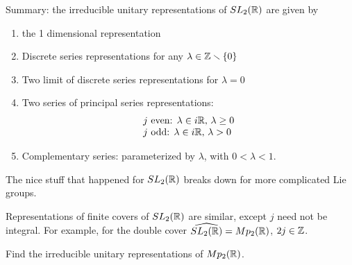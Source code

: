  Summary: the irreducible unitary representations of $SL_2(\mathbb{R})$ are given by
 \begin{enumerate}
   \item the 1 dimensional representation
   \item Discrete series representations for any $\lambda\in \mathbb{Z}\smallsetminus \{0\}$
   \item Two limit of discrete series representations for $\lambda=0$
   \item Two series of principal series representations:
   \[\begin{tabular}{l}
     $j$ even: $\lambda\in i\RR$, $\lambda \ge 0$\\
     $j$ odd: $\lambda \in i\RR$, $\lambda > 0$
   \end{tabular}\]
   \item Complementary series: parameterized by $\lambda$, with $0< \lambda < 1$.
 \end{enumerate}

 The nice stuff that happened for $SL_2(\mathbb{R})$ breaks down for more complicated Lie
 groups.

 Representations of finite covers of $SL_2(\mathbb{R})$ are similar, except $j$ need not be
 integral. For example, for the double cover $\widehat{SL_2(\mathbb{R})} = Mp_2(\mathbb{R})$, $2j\in
 \mathbb{Z}$.
 \begin{exercise}
   Find the irreducible unitary representations of $Mp_2(\mathbb{R})$.
 \end{exercise}

